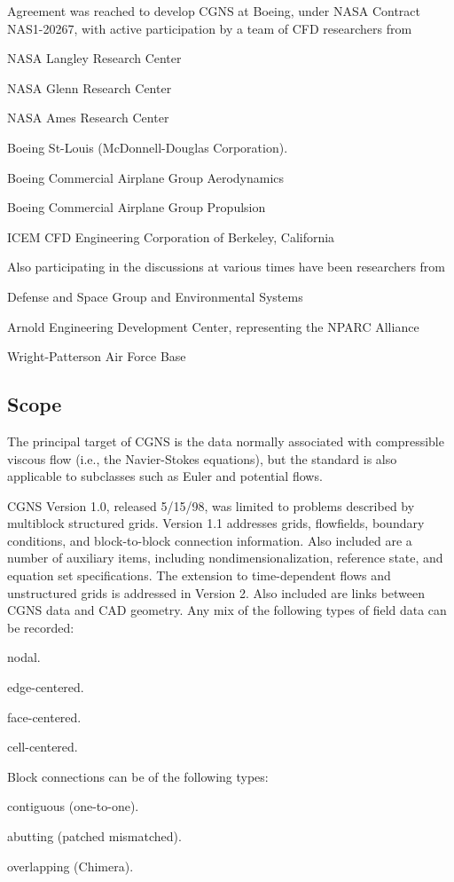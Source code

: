 Agreement was reached to develop CGNS at Boeing, under NASA Contract
NAS1-20267, with active participation by a team of CFD researchers from

\begin{itemize*}
\item NASA Langley Research Center
\item NASA Glenn Research Center
\item NASA Ames Research Center
\item Boeing St-Louis (McDonnell-Douglas Corporation).
\item Boeing Commercial Airplane Group Aerodynamics
\item Boeing Commercial Airplane Group Propulsion
\item ICEM CFD Engineering Corporation of Berkeley, California
\end{itemize*}
Also participating in the discussions at various times have been
researchers from
\begin{itemize*}
\item Defense and Space Group and Environmental Systems
\item Arnold Engineering Development Center, representing the NPARC Alliance
\item Wright-Patterson Air Force Base
\end{itemize*}

\subsection{Scope}

The principal target of CGNS is the data normally associated with
compressible viscous flow (i.e., the Navier-Stokes equations), but the
standard is also applicable to subclasses such as Euler and potential
flows.

CGNS Version 1.0, released 5/15/98, was limited to problems described
by multiblock structured grids. Version 1.1 addresses grids,
flowfields, boundary conditions, and block-to-block connection
information. Also included are a number of auxiliary items,
including nondimensionalization, reference state, and equation set
specifications. The extension to time-dependent flows and unstructured
grids is addressed in Version 2. Also included are links between CGNS
data and CAD geometry. Any mix of the following types of field data can
be recorded:

\begin{itemize*}
\item nodal.
\item edge-centered.
\item face-centered.
\item cell-centered.
\end{itemize*}
Block connections can be of the following types:
\begin{itemize*}
\item contiguous (one-to-one).
\item abutting (patched mismatched).
\item overlapping (Chimera).
\end{itemize*}

